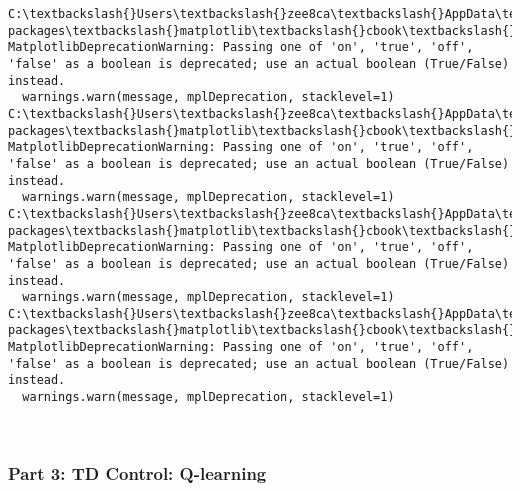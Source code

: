 \documentclass[11pt]{article}
\begin{document}
    \begin{Verbatim}[commandchars=\\\{\}]
C:\textbackslash{}Users\textbackslash{}zee8ca\textbackslash{}AppData\textbackslash{}Local\textbackslash{}Continuum\textbackslash{}anaconda3\textbackslash{}lib\textbackslash{}site-packages\textbackslash{}matplotlib\textbackslash{}cbook\textbackslash{}deprecation.py:107: MatplotlibDeprecationWarning: Passing one of 'on', 'true', 'off', 'false' as a boolean is deprecated; use an actual boolean (True/False) instead.
  warnings.warn(message, mplDeprecation, stacklevel=1)
C:\textbackslash{}Users\textbackslash{}zee8ca\textbackslash{}AppData\textbackslash{}Local\textbackslash{}Continuum\textbackslash{}anaconda3\textbackslash{}lib\textbackslash{}site-packages\textbackslash{}matplotlib\textbackslash{}cbook\textbackslash{}deprecation.py:107: MatplotlibDeprecationWarning: Passing one of 'on', 'true', 'off', 'false' as a boolean is deprecated; use an actual boolean (True/False) instead.
  warnings.warn(message, mplDeprecation, stacklevel=1)
C:\textbackslash{}Users\textbackslash{}zee8ca\textbackslash{}AppData\textbackslash{}Local\textbackslash{}Continuum\textbackslash{}anaconda3\textbackslash{}lib\textbackslash{}site-packages\textbackslash{}matplotlib\textbackslash{}cbook\textbackslash{}deprecation.py:107: MatplotlibDeprecationWarning: Passing one of 'on', 'true', 'off', 'false' as a boolean is deprecated; use an actual boolean (True/False) instead.
  warnings.warn(message, mplDeprecation, stacklevel=1)
C:\textbackslash{}Users\textbackslash{}zee8ca\textbackslash{}AppData\textbackslash{}Local\textbackslash{}Continuum\textbackslash{}anaconda3\textbackslash{}lib\textbackslash{}site-packages\textbackslash{}matplotlib\textbackslash{}cbook\textbackslash{}deprecation.py:107: MatplotlibDeprecationWarning: Passing one of 'on', 'true', 'off', 'false' as a boolean is deprecated; use an actual boolean (True/False) instead.
  warnings.warn(message, mplDeprecation, stacklevel=1)

    \end{Verbatim}

    \begin{center}
    \end{center}
    { \hspace*{\fill} \\}
    
    \subsubsection{Part 3: TD Control:
Q-learning}\label{part-3-td-control-q-learning}
\end{document}
